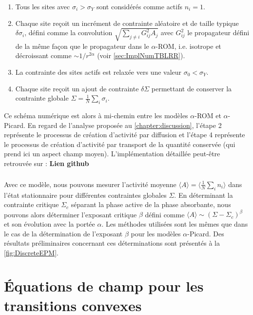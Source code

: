 \begin{enumerate}
	\item Tous les sites avec $\sigma_i > \sigma_Y$ sont considérés comme actifs $n_i=1$.
	\item Chaque site reçoit un incrément de contrainte aléatoire et de taille typique $\delta\sigma_i$, défini comme la convolution $\sqrt{\sum_{j\neq i}G_{ij}^2A_j}$ avec $G_{ij}^2$ le propagateur défini de la même façon que le propagateur dans le $\alpha$-ROM, i.e. isotrope et décroissant comme $\sim 1/r^{2\alpha}$ (voir \autoref{sec:ImplNumTBLRR}).
	\item La contrainte des sites actifs est relaxée vers une valeur $\sigma_0 < \sigma_Y$.
	\item Chaque site reçoit un ajout de contrainte $\delta\Sigma$ permettant de conserver la contrainte globale $\Sigma = \frac{1}{N}\sum_{i}\sigma_i$.
\end{enumerate}

\noindent Ce schéma numérique est alors à mi-chemin entre les modèles $\alpha$-ROM et $\alpha$-Picard. En regard de l'analyse proposée au \autoref{chapter:discussion}, l'étape 2 représente le processus de création d'activité par diffusion et l'étape 4 représente le processus de création d'activité par transport de la quantité conservée (qui prend ici un aspect champ moyen). L'implémentation détaillée peut-être retrouvée sur : \textbf{Lien github}

\subparagraph{}Avec ce modèle, nous pouvons mesurer l'activité moyenne $\langle A \rangle = \langle \frac{1}{N}\sum_{i}n_i \rangle $ dans l'état stationnaire pour différentes contraintes globales $\Sigma$. En déterminant la contrainte critique $\Sigma_c$ séparant la phase active de la phase absorbante, nous pouvons alors déterminer l'exposant critique $\beta$ défini comme $\langle A \rangle \sim (\Sigma - \Sigma_c)^\beta$ et son évolution avec la portée $\alpha$. Les méthodes utilisées sont les mêmes que dans le cas de la détermination de l'exposant $\beta$ pour les modèles $\alpha$-Picard. Des résultats préliminaires concernant ces déterminations sont présentés à la \autoref{fig:DiscreteEPM}.

\FloatBarrier

\section{Équations de champ pour les transitions convexes}

\stoptocwriting

